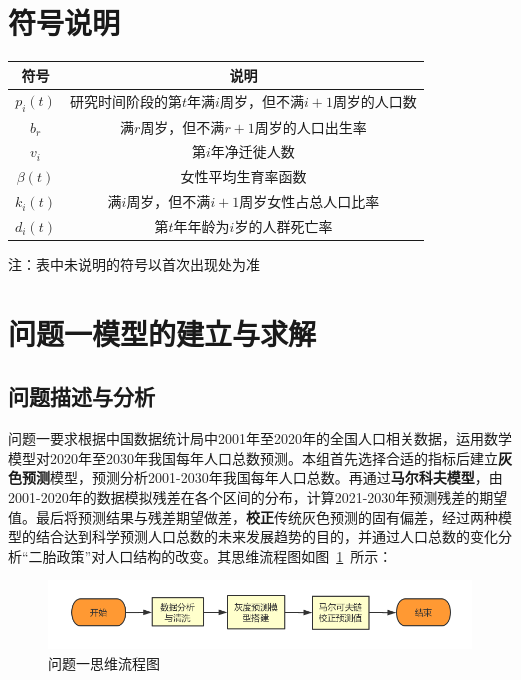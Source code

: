 \documentclass{whutmod}
\begin{document}
		
	\section{符号说明}
		\begin{table}[H]
		\centering
		\setlength{\tabcolsep}{5mm}
		\begin{tabular}{cc}
			\toprule[1.5pt]
			\multicolumn{1}{m{1cm}}{\centering 符号} & \multicolumn{1}{m{13cm}}{\centering 说明} \\
			\midrule[1pt]		
			$p_i(t)$  & 研究时间阶段的第$t$年满$i$周岁，但不满$i+1$周岁的人口数 \\ 
			$b_r$  & 满$r$周岁，但不满$r+1$周岁的人口出生率  \\ 
		   	$v_i$  & 第$i$年净迁徙人数  \\ 
		   	$\beta(t)$  & 女性平均生育率函数  \\ 
		   	$k_i(t)$  & 满$i$周岁，但不满$i+1$周岁女性占总人口比率 \\ 
		   	$d_i(t)$  & 第$t$年年龄为$i$岁的人群死亡率 \\ 
			\bottomrule[1.5pt]
		\end{tabular}
		\begin{tablenotes}
		\item 注：表中未说明的符号以首次出现处为准
		\end{tablenotes}
		\end{table}

		
			\section{问题一模型的建立与求解}
		\subsection{问题描述与分析}
		
		问题一要求根据中国数据统计局中2001年至2020年的全国人口相关数据，运用数学模型对2020年至2030年我国每年人口总数预测。本组首先选择合适的指标后建立\textbf{灰色预测}模型，预测分析2001-2030年我国每年人口总数。再通过\textbf{马尔科夫模型}，由2001-2020年的数据模拟残差在各个区间的分布，计算2021-2030年预测残差的期望值。最后将预测结果与残差期望做差，\textbf{校正}传统灰色预测的固有偏差，经过两种模型的结合达到科学预测人口总数的未来发展趋势的目的，并通过人口总数的变化分析“二胎政策”对人口结构的改变。其思维流程图如图~\ref{lcdadat}~所示：
		
		\begin{figure}[H]
			\centering
			\includegraphics[width=\textwidth]{figures/lctc.png}
			\caption{问题一思维流程图}\label{lcdadat}
		\end{figure}
%		
		
\end{document}
